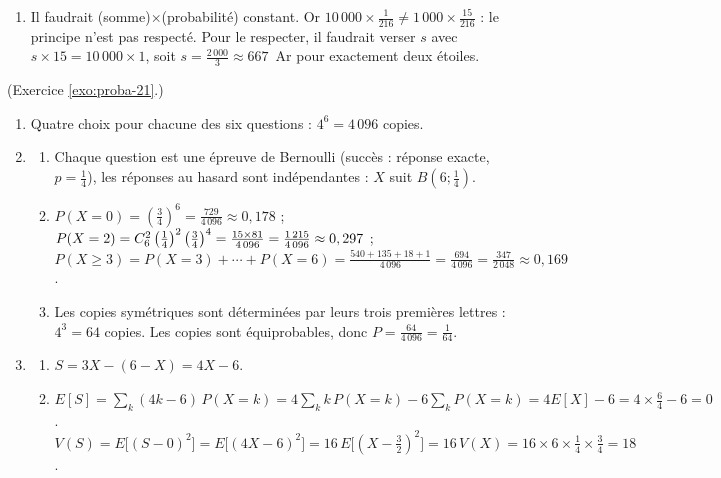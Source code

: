 \begin{corrige}
\begin{sol}
\begin{enumerate}
\begin{enumerate}
            L'esp\'erance est positive : le jeu est favorable au joueur (en moyenne il gagne environ $15,74$~Ar par partie).
      \item Si la partie co\^ute $m$ ariary, $E[G] = \frac{10\,000 + 15\times 1\,000}{216} - m = \frac{3\,125}{27} - m$.
            Le jeu est \'equitable pour $m = \frac{3\,125}{27}\approx 115,74$~Ar.
      \end{enumerate}
\item Il faudrait (somme)$\times$(probabilit\'e) constant. Or $10\,000\times\frac{1}{216} \neq 1\,000\times\frac{15}{216}$ :
      le principe n'est pas respect\'e. Pour le respecter, il faudrait verser $s$ avec $s\times 15 = 10\,000\times 1$,
      soit $s = \frac{2\,000}{3}\approx 667$~Ar pour exactement deux \'etoiles.
\end{enumerate}
\end{sol}
%
\begin{sol} (Exercice \ref{exo:proba-21}.)
\begin{enumerate}
\item Quatre choix pour chacune des six questions : $4^6 = 4\,096$ copies.
\item \begin{enumerate}
      \item Chaque question est une \'epreuve de Bernoulli (succ\`es : r\'eponse exacte, $p = \frac{1}{4}$),
            les r\'eponses au hasard sont ind\'ependantes : $X$ suit $B\!\left(6 ; \frac{1}{4}\right)$.
      \item $P(X=0) = \left(\frac{3}{4}\right)^6 = \frac{729}{4\,096}\approx 0,178$ ;
            $P(X=2) = C_{6}^{2}\left(\frac{1}{4}\right)^2\left(\frac{3}{4}\right)^4 = \frac{15\times 81}{4\,096} = \frac{1\,215}{4\,096}\approx 0,297$ ;
            $P(X\geq 3) = P(X=3)+\cdots+P(X=6) = \frac{540 + 135 + 18 + 1}{4\,096} = \frac{694}{4\,096} = \frac{347}{2\,048}\approx 0,169$.
      \item Les copies sym\'etriques sont d\'etermin\'ees par leurs trois premi\`eres lettres : $4^3 = 64$ copies.
            Les copies sont \'equiprobables, donc $P = \frac{64}{4\,096} = \frac{1}{64}$.
      \end{enumerate}
\item \begin{enumerate}
      \item $S = 3X - (6 - X) = 4X - 6$.
      \item $E[S] = \sum_k (4k-6)\,P(X=k) = 4\sum_k k\,P(X=k) - 6\sum_k P(X=k) = 4E[X] - 6 = 4\times\frac{6}{4} - 6 = 0$.
            $V(S) = E\big[(S - 0)^2\big] = E\big[(4X - 6)^2\big] = 16\,E\big[(X - \tfrac{3}{2})^2\big] = 16\,V(X) = 16\times 6\times\frac{1}{4}\times\frac{3}{4} = 18$.

\end{enumerate}
\end{enumerate}
\end{sol}
\end{corrige}
